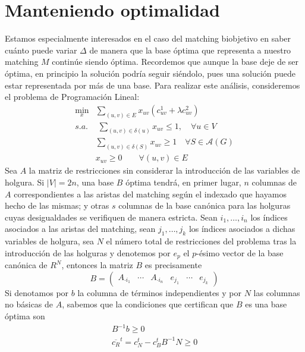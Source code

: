 \documentclass[twoside,a4paper,openright,12pt]{book}
\begin{document}
\section{Manteniendo optimalidad}
Estamos especialmente interesados en el caso del matching biobjetivo en saber cuánto puede variar $\Delta$ de manera que la base óptima que representa a nuestro matching $M$ continúe siendo óptima. Recordemos que aunque la base deje de ser óptima, en principio la solución podría seguir siéndolo, pues una solución puede estar representada por más de una base. Para realizar este análisis, consideremos el problema de Programación Lineal:
\begin{align*}
\min_x & \sum_{(u,v) \in E}x_{uv}(c^1_{uv} + \lambda c^2_{uv})\\
s.a.&\;\sum_{(u,v)\in\delta(u)} x_{uv} \leq 1, \quad \forall u \in V\\
&\sum_{(u,v)\in \delta(S)} x_{uv} \geq 1\quad \forall S \in \mathcal{A}(G)	\\
&x_{uv} \geq 0 \qquad \forall(u,v)\in E
\end{align*}
Sea $A$ la matriz de restricciones sin considerar la introducción de las variables de holgura. Si $|V|=2n$, una base $B$ óptima tendrá, en primer lugar, $n$ columnas de $A$ correspondientes a las aristas del matching según el indexado que hayamos hecho de las mismas; y otras $s$ columnas de la base canónica para las holguras cuyas desigualdades se verifiquen de manera estricta. Sean $i_1,\dotsc,i_n$ los índices asociados a las aristas del matching, sean $j_1,\dotsc,j_k$ los índices asociados a dichas variables de holgura, sea $N$ el número total de restricciones del problema tras la introducción de las holguras y denotemos por $e_p$ el $p$-ésimo vector de la base canónica de $R^N$, entonces la matriz $B$ es precisamente
$$ B= 
\begin{pmatrix}
A_{\cdot i_1} & \cdots & A_{\cdot i_n} & e_{j_1} & \cdots & e_{j_k}
\end{pmatrix}
$$
Si denotamos por $b$ la columna de términos independientes y por $N$ las columnas no básicas de $A$, sabemos que la condiciones que certifican que $B$ es una base óptima son
\begin{align*}
B^{-1}b\geq0\\
\overline{c_R}^t = c_N^t - c_B^t B^{-1}N\geq 0
\end{align*}
\end{document}
